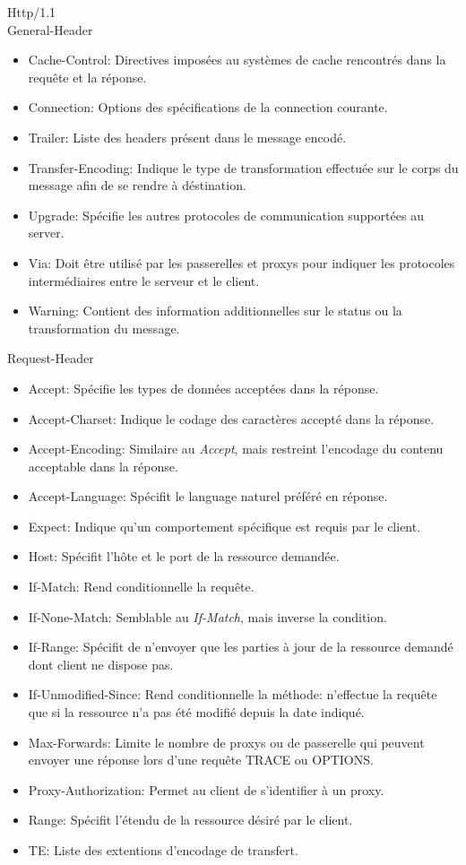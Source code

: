 \documentclass{scrreprt}
\begin{document}
Http/1.1\\
    General-Header\\
        \begin{itemize}
        \item Cache-Control: Directives imposées au systèmes de cache rencontrés dans la requête et la réponse.      
        \item Connection: Options des spécifications de la connection courante.     
        \item Trailer: Liste des headers présent dans le message encodé.          
        \item Transfer-Encoding: Indique le type de transformation effectuée sur le corps du message afin de se rendre à déstination.
        \item Upgrade: Spécifie les autres protocoles de communication supportées au server.          
        \item Via: Doit être utilisé par les passerelles et proxys pour indiquer les protocoles intermédiaires entre le serveur et le client.
        \item Warning: Contient des information additionnelles sur le status ou la transformation du message.
        \end{itemize}
    Request-Header\\
        \begin{itemize}
        \item Accept: Spécifie les types de données acceptées dans la réponse.
        \item Accept-Charset: Indique le codage des caractères accepté dans la réponse.
        \item Accept-Encoding: Similaire au \textit{Accept}, mais restreint l'encodage du contenu acceptable dans la réponse.
        \item Accept-Language: Spécifit le language naturel préféré en réponse.
        \item Expect: Indique qu'un comportement spécifique est requis par le client.
        \item Host: Spécifit l'hôte et le port de la ressource demandée.
        \item If-Match: Rend conditionnelle la requête.
        \item If-None-Match: Semblable au \textit{If-Match}, mais inverse la condition.
        \item If-Range: Spécifit de n'envoyer que les parties à jour de la ressource demandé dont client ne dispose pas.
        \item If-Unmodified-Since: Rend conditionnelle la méthode: n'effectue la requête que si la ressource n'a pas été modifié depuis la date indiqué.
        \item Max-Forwards: Limite le nombre de proxys ou de passerelle qui peuvent envoyer une réponse lors d'une requête TRACE ou OPTIONS.
        \item Proxy-Authorization: Permet au client de s'identifier à un proxy.
        \item Range: Spécifit l'étendu de la ressource désiré par le client.
        \item TE: Liste des extentions d'encodage de transfert. 
        \end{itemize}
\end{document}
